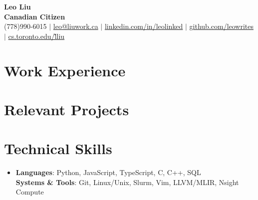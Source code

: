 \documentclass[letterpaper,11pt]{article}
\newcommand{\resumeSubHeadingListStart}{\begin{itemize}[leftmargin=0in, rightmargin=0in, label={}]}
\newcommand{\resumeSubHeadingListEnd}{\end{itemize}}
\begin{document}

\begin{center}
    {\Huge \color{blue}\textbf{Leo Liu}} \\
    \textbf{Canadian Citizen} \\
    (778)990-6015 $|$ \href{mailto:leo@liuwork.ca}{leo@liuwork.ca} $|$ 
    \href{https://linkedin.com/in/leolinked}{linkedin.com/in/leolinked} $|$
    \href{https://github.com/leowrites}{github.com/leowrites} $|$
    \href{https://www.cs.toronto.edu/~lliu}{cs.toronto.edu/\~lliu}
    \vspace{-8pt}
\end{center}



\section{Work Experience}
    \resumeSubHeadingListStart
        
        
        
    \resumeSubHeadingListEnd


\section{Relevant Projects}
    \resumeSubHeadingListStart
        
        
    \resumeSubHeadingListEnd

\section{Technical Skills}
 \begin{itemize}[leftmargin=0in, label={}]
    \item
        \textbf{Languages}: Python, JavaScript, TypeScript, C, C++, SQL \\
        \textbf{Systems \& Tools}: Git, Linux/Unix, Slurm, Vim, LLVM/MLIR, Nsight Compute \\
 \end{itemize}
 
\end{document}
